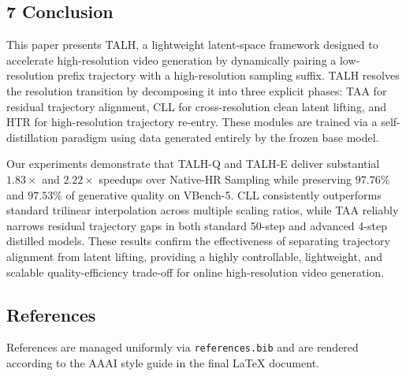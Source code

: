\hypertarget{conclusion}{%
\subsection{7 Conclusion}\label{conclusion}}

This paper presents TALH, a lightweight latent-space framework designed to accelerate high-resolution video generation by dynamically pairing a low-resolution prefix trajectory with a high-resolution sampling suffix. TALH resolves the resolution transition by decomposing it into three explicit phases: TAA for residual trajectory alignment, CLL for cross-resolution clean latent lifting, and HTR for high-resolution trajectory re-entry. These modules are trained via a self-distillation paradigm using data generated entirely by the frozen base model.

Our experiments demonstrate that TALH-Q and TALH-E deliver substantial \(1.83\times\) and \(2.22\times\) speedups over Native-HR Sampling while preserving \(97.76\%\) and \(97.53\%\) of generative quality on VBench-5. CLL consistently outperforms standard trilinear interpolation across multiple scaling ratios, while TAA reliably narrows residual trajectory gaps in both standard 50-step and advanced 4-step distilled models. These results confirm the effectiveness of separating trajectory alignment from latent lifting, providing a highly controllable, lightweight, and scalable quality-efficiency trade-off for online high-resolution video generation.

\hypertarget{references}{%
\subsection{References}\label{references}}

References are managed uniformly via \texttt{references.bib} and are rendered according to the AAAI style guide in the final LaTeX document.
